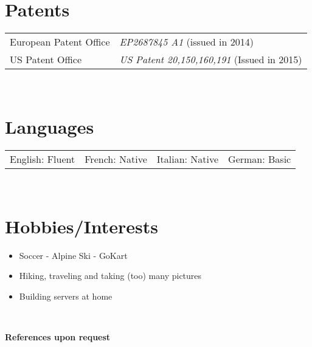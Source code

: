 \documentclass{CV}
\begin{document}




\section*{Patents}
\vspace{-1.5em}
	\begin{center}
	\begin{tabular}{ll}
	European Patent Office & \textit{EP2687845 A1} (issued in 2014)\\
	US Patent Office & \textit{US Patent 20,150,160,191} (Issued in 2015)
	\end{tabular}
	\end{center}
~




\section*{Languages}
\begin{tabularx}{\textwidth}{XXXX}
English: Fluent & French: Native & Italian: Native & German: Basic\\
\end{tabularx}
~





\section*{Hobbies/Interests}
\begin{itemize}\setlength\itemsep{0em}
\item Soccer - Alpine Ski - GoKart
\item Hiking, traveling and taking (too) many pictures
\item Building servers at home
\end{itemize}
~




\begin{center}
\Large \textbf{References upon request}
\end{center}
\end{document}
